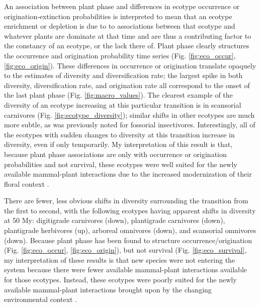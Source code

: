 \documentclass[12pt,letterpaper]{article}
\begin{document}
An association between plant phase and differences in ecotype occurrence or origination-extinction probabilities is interpreted to mean that an ecotype enrichment or depletion is due to to associations between that ecotype and whatever plants are dominate at that time and are thus a contributing factor to the constancy of an ecotype, or the lack there of. Plant phase clearly structures the occurrence and origination probability time series (Fig. \ref{fig:eco_occur}, \ref{fig:eco_origin}). These differences in occurrence or origination translate opaquely to the estimates of diversity and diversification rate; the largest spike in both diversity, diversification rate, and origination rate all correspond to the onset of the last plant phase (Fig. \ref{fig:macro_values}). The clearest example of the diversity of an ecotype increasing at this particular transition is in scansorial carnivores (Fig. \ref{fig:ecotype_diversity}); similar shifts in other ecotypes are much more subtle, as was previously noted for fossorial insectivores. Interestingly, all of the ecotypes with sudden changes to diversity at this transition increase in diversity, even if only temporarily. My interpretation of this result is that, because plant phase associations are only with occurrence or origination probabilities and not survival, these ecotypes were well suited for the newly available mammal-plant interactions due to the increased modernization of their floral context \citep{Graham2011a}.

There are fewer, less obvious shifts in diversity surrounding the transition from the first to second, with the following ecotypes having apparent shifts in diversity at 50 My: digitigrade carnivores (down), plantigrade carnivores (down), plantigrade herbivores (up), arboreal omnivores (down), and scansorial omnivores (down). Because plant phase has been found to structure occurrence/origination (Fig. \ref{fig:eco_occur}, \ref{fig:eco_origin}), but not survival (Fig. \ref{fig:eco_survival}, my interpretation of these results is that new species were not entering the system because there were fewer available mammal-plant interactions available for those ecotypes. Instead, these ecotypes were poorly suited for the newly available mammal-plant interactions brought upon by the changing environmental context \citep{Graham2011a}.
\end{document}
